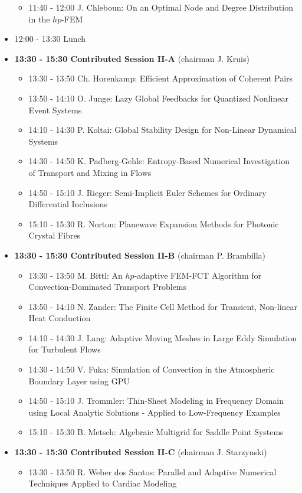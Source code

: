 \documentclass[10pt, A4]{article}%
\begin{document}
\begin{itemize}
\begin{itemize}
    \item 11:40 - 12:00 J. Chleboun: On an Optimal Node and Degree Distribution in the $hp$-FEM
  \end{itemize}
  \item 12:00 - 13:30 Lunch
  \item {\bf 13:30 - 15:30 Contributed Session II-A} (chairman J. Kruis) 
  \begin{itemize}
    \item 13:30 - 13:50 Ch. Horenkamp: Efficient Approximation of Coherent Pairs
    \item 13:50 - 14:10 O. Junge: Lazy Global Feedbacks for Quantized Nonlinear Event Systems
    \item 14:10 - 14:30 P. Koltai: Global Stability Design for Non-Linear Dynamical Systems
    \item 14:30 - 14:50 K. Padberg-Gehle: Entropy-Based Numerical Investigation of Transport and Mixing in Flows
    \item 14:50 - 15:10 J. Rieger: Semi-Implicit Euler Schemes for Ordinary Differential Inclusions
    \item 15:10 - 15:30 R. Norton: Planewave Expansion Methods for Photonic Crystal Fibres
  \end{itemize}
  \item {\bf 13:30 - 15:30 Contributed Session II-B} (chairman P. Brambilla) 
  \begin{itemize}
    \item 13:30 - 13:50 M. Bittl: An $hp$-adaptive FEM-FCT Algorithm for Convection-Dominated Transport Problems
    \item 13:50 - 14:10 N. Zander: The Finite Cell Method for Transient, Non-linear Heat Conduction
    \item 14:10 - 14:30 J. Lang: Adaptive Moving Meshes in Large Eddy Simulation for Turbulent Flows
    \item 14:30 - 14:50 V. Fuka: Simulation of Convection in the Atmospheric Boundary Layer using GPU
    \item 14:50 - 15:10 J. Trommler: Thin-Sheet Modeling in Frequency Domain using Local Analytic Solutions - Applied to Low-Frequency Examples
    \item 15:10 - 15:30 B. Metsch: Algebraic Multigrid for Saddle Point Systems
  \end{itemize}
\newpage
    \item {\bf 13:30 - 15:30 Contributed Session II-C} (chairman J. Starzynski) 
  \begin{itemize}
    \item 13:30 - 13:50 R. Weber dos Santos: Parallel and Adaptive Numerical Techniques Applied to Cardiac Modeling

\end{itemize}
\end{itemize}
\end{document}
